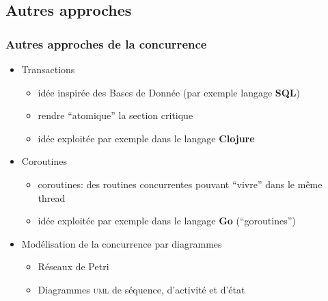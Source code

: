 \documentclass{beamer}
\begin{document}
\subsection{Autres approches}
\begin{frame}
  \frametitle{Autres approches de la concurrence}
  \begin{itemize}
  
  \item<2->Transactions
    \begin{itemize}
    \item idée inspirée des Bases de Donnée (par exemple langage \textbf{SQL})
    \item rendre ``atomique'' la section critique
    \item idée exploitée par exemple dans le langage \textbf{Clojure}
    \end{itemize}
  
  \item<3->Coroutines
    \begin{itemize}
    \item coroutines: des routines concurrentes pouvant ``vivre'' dans le même thread
    \item idée exploitée par exemple dans le langage \textbf{Go} (``goroutines'')
    \end{itemize}

  \item<4->Modélisation de la concurrence par diagrammes
    \begin{itemize}
    \item Réseaux de Petri
    \item Diagrammes \textsc{uml} de séquence, d'activité et d'état
    \end{itemize}
  
  \end{itemize}
\end{frame}
\end{document}
